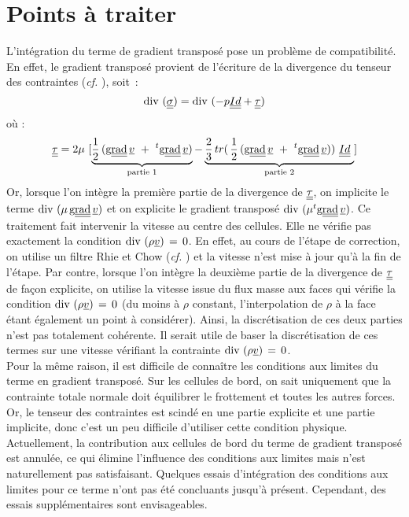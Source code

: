 \section*{Points \`a traiter} \label{Base_Visecv_paragraphe4}
L'intégration du terme de gradient transposé pose un problème de compatibilité.
En effet, le gradient transposé provient de l'écriture de la divergence
du tenseur des contraintes (\emph{cf.} ), soit~:
\begin{equation}\notag
\text{div}\,\,(\underline{\underline{\sigma}}) = \text{div}\,\,(- p \underline{\underline{Id}} + \underline{\underline{\tau }})
\end{equation}
où :
\begin{equation}\notag
\underline{\underline{\tau}} = 2 \mu\ [\underbrace{\displaystyle \frac{1}{2}\,(\text{g}\underline{\underline{{\text{rad}}}}\, \underline
{v}\ +\ ^t\text{g}\underline{\underline{{\text{rad}}}}\, \underline {v})}_{\text{partie 1}} -\underbrace{\displaystyle \frac{2}{3}\,tr(\,\frac{1}{2}\,(\text{g}\underline{\underline{{\text{rad}}}}\, \underline
{v}\ +\ ^t\text{g}\underline{\underline{{\text{rad}}}}\, \underline {v}))\ \underline{\underline{Id}}\ }_{\text{partie 2}}]
\end{equation}
Or, lorsque l'on intègre la première partie de la divergence de
$\underline{\underline{\tau}}$, on implicite le terme $\text{div}\,\,(\mu\,\text{g}\underline{\underline{{\text{rad}}}}\, \underline{v})$ et on
explicite le gradient transposé $\text{div}\,\,(\mu ^t\text{g}\underline{\underline{{\text{rad}}}}\, \underline{v})$.
 Ce traitement fait intervenir la vitesse au centre des cellules. Elle ne
vérifie pas exactement la condition $\text{div}\,\,(\rho \underline{v})\,=\,0$. En
effet, au cours de l'étape de correction, on utilise un filtre Rhie et Chow
(\emph{cf.} ) et la vitesse n'est mise à jour qu'à la fin de
l'étape. Par contre, lorsque l'on intègre la deuxième partie de
la divergence de $\underline{\underline{\tau}}$ de façon explicite, on utilise
la vitesse issue du flux masse aux faces qui vérifie la condition $\text{div}\,\,(\rho
\underline{v})\,=\,0$ (du moins à $\rho$ constant, l'interpolation de $\rho$ à
la face étant également un point à considérer). Ainsi, la discrétisation de ces
deux parties n'est pas totalement cohérente. Il serait utile de baser la
discrétisation de ces termes sur une vitesse vérifiant la contrainte
$\text{div}\,\,(\rho \underline{v})\,=\,0$.\\
Pour la même raison, il est difficile de connaître les conditions aux limites du
terme en gradient transposé. Sur les cellules de bord, on sait uniquement que la
contrainte totale normale doit équilibrer le frottement et toutes les autres
forces. Or, le tenseur des contraintes est scindé en une partie explicite et une partie implicite, donc c'est un peu difficile d'utiliser cette condition physique.\\
Actuellement, la contribution aux cellules de bord du terme de gradient transposé est
annulée, ce qui élimine l'influence des conditions aux limites mais n'est naturellement pas satisfaisant. Quelques essais d'intégration des conditions aux limites pour ce terme n'ont pas été concluants jusqu'à présent. Cependant, des essais supplémentaires
sont envisageables.
